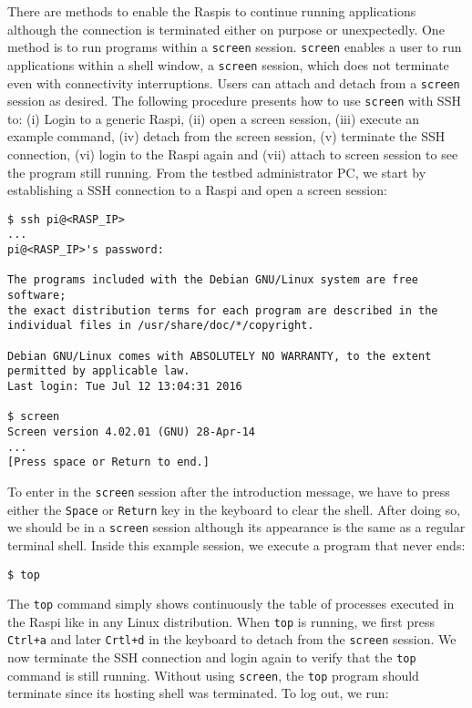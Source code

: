 There are methods to enable the \ac{Raspi}s to continue running
applications although the connection is terminated either on purpose or
unexpectedly. One method is to run programs within a \texttt{screen} session.
\texttt{screen} enables a user to run applications within a shell
window, a \texttt{screen} session, which does not terminate even with
connectivity interruptions. Users can attach and detach from a
\texttt{screen} session
as desired. The following procedure presents how to use \texttt{screen} with
\ac{SSH} to: (i) Login to a generic \ac{Raspi}, (ii) open a screen session,
(iii) execute an example command, (iv) detach from the screen session, (v)
terminate the \ac{SSH} connection, (vi) login to the \ac{Raspi} again
and (vii) attach to screen session to see the program still running.
From the testbed administrator \ac{PC}, we start by establishing a \ac{SSH}
connection to a \ac{Raspi} and open a screen session:

\begin{lstlisting}[]
$ ssh pi@<RASP_IP>
...
pi@<RASP_IP>'s password:

The programs included with the Debian GNU/Linux system are free software;
the exact distribution terms for each program are described in the
individual files in /usr/share/doc/*/copyright.

Debian GNU/Linux comes with ABSOLUTELY NO WARRANTY, to the extent
permitted by applicable law.
Last login: Tue Jul 12 13:04:31 2016

$ screen
Screen version 4.02.01 (GNU) 28-Apr-14
...
[Press space or Return to end.]
\end{lstlisting}
\FloatBarrier
\vspace{-5mm}

To enter in the \texttt{screen} session after the introduction message, we
have to press either the \texttt{Space} or \texttt{Return} key in the
keyboard to clear the shell. After doing so, we should be in a
\texttt{screen} session although its appearance is the same as a regular
terminal shell. Inside this example session, we execute a program that
never ends:

\begin{lstlisting}[]
$ top
\end{lstlisting}
\FloatBarrier
\vspace{-5mm}

The \texttt{top} command simply shows continuously the table of processes
executed in the \ac{Raspi} like in any Linux distribution. When \texttt{top}
is running, we first press \texttt{Ctrl+a} and later \texttt{Crtl+d}
in the keyboard to detach from the \texttt{screen} session. We now
terminate the \ac{SSH} connection and login again to verify that the
\texttt{top} command is still running. Without using \texttt{screen},
the \texttt{top} program should terminate since its hosting shell was
terminated. To log out, we run:

